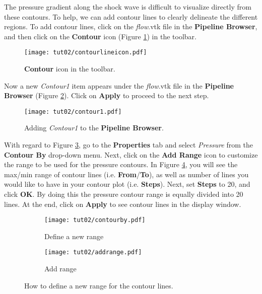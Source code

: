 The pressure gradient along the shock wave is difficult to visualize directly from these contours. To help, we can add contour lines to clearly delineate the different regions. To add contour lines, click on the \textit{flow}.vtk file in the \textbf{Pipeline Browser}, and then click on the \textbf{Contour} icon (Figure \ref{fig2:contour_icon}) in the toolbar.
\begin{figure}[htbp]
    \centering
    \texttt{[image: tut02/contourlineicon.pdf]}
    \caption{\textbf{Contour} icon in the toolbar.}
    \label{fig2:contour_icon}
\end{figure}
Now a new \textit{Contour1} item appears under the \textit{flow}.vtk file in the \textbf{Pipeline Browser} (Figure \ref{fig2:contour1}). Click on \textbf{Apply} to proceed to the next step.
\begin{figure}[htbp]
    \centering
    \texttt{[image: tut02/contour1.pdf]}
    \caption{Adding \textit{Contour1} to the \textbf{Pipeline Browser}.}
    \label{fig2:contour1}
\end{figure}
With regard to Figure \ref{fig2:contourby a}, go to the \textbf{Properties} tab and select \textit{Pressure} from the \textbf{Contour By} drop-down menu. Next, click on the \textbf{Add Range} icon to customize the range to be used for the pressure contours. In Figure \ref{fig2:contourby b}, you will see the max/min range of contour lines (i.e. \textbf{From}/\textbf{To}), as well as number of lines you would like to have in your contour plot (i.e. \textbf{Steps}). Next, set \textbf{Steps} to 20, and click \textbf{OK}. By doing this the pressure contour range is equally divided into 20 lines. At the end, click on \textbf{Apply} to see contour lines in the display window.
\begin{figure}[htbp]
    \centering
     \begin{subfigure}[b]{.4\textwidth}
         \centering
         \texttt{[image: tut02/contourby.pdf]}
         \caption{Define a new range}
         \label{fig2:contourby a}
     \end{subfigure}
     \hfill
     \begin{subfigure}[b]{.4\textwidth}
         \centering
         \texttt{[image: tut02/addrange.pdf]}
         \caption{Add range}
         \label{fig2:contourby b}
     \end{subfigure}     
    \caption{How to define a new range for the contour lines.}
    \label{fig2:contourby}
\end{figure}
